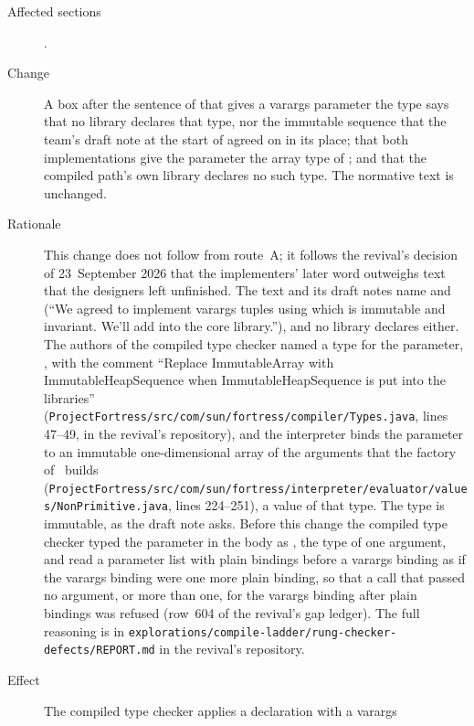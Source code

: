 \begin{description}
\item[Affected sections] .
\item[Change] A box after the sentence of  that gives a
varargs parameter the type 
says that no library declares that type, nor the immutable sequence that the
team's draft note at the start of  agreed on in its place;
that both implementations give the parameter the array type
 of \library;
and that the compiled path's own library declares no such type.
The normative text is unchanged.
\item[Rationale] This change does not follow from route~A; it follows the
revival's decision of 23~September 2026 that the implementers' later word
outweighs text that the designers left unfinished.
The text and its draft notes name  and
 (``We agreed to implement varargs tuples using
 which is immutable and invariant.
We'll add  into the core library.''), and no
library declares either.
The authors of the compiled type checker named a type for the parameter,
, with the
comment ``Replace ImmutableArray with ImmutableHeapSequence when
ImmutableHeapSequence is put into the libraries''
(\nolinkurl{ProjectFortress/src/com/sun/fortress/compiler/Types.java}, lines
47--49, in the revival's repository), and the interpreter binds the parameter
to an immutable one-dimensional array of the arguments that the factory
 of \library\ builds
(\nolinkurl{ProjectFortress/src/com/sun/fortress/interpreter/evaluator/values/NonPrimitive.java},
lines 224--251), a value of that type.
The type is immutable, as the draft note asks.
Before this change the compiled type checker typed the parameter in the body
as , the type of one argument, and read a parameter list with plain
bindings before a varargs binding as if the varargs binding were one more plain
binding, so that a call that passed no argument, or more than one, for the
varargs binding after plain bindings was refused (row~604 of the revival's gap
ledger).
The full reasoning is in
\nolinkurl{explorations/compile-ladder/rung-checker-defects/REPORT.md} in the
revival's repository.
\item[Effect] The compiled type checker applies a declaration with a varargs

\end{description}

